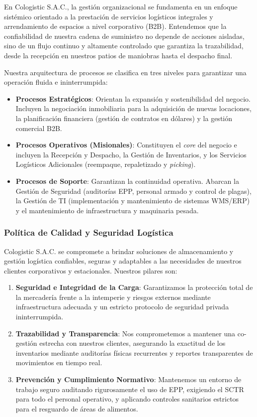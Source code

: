 \documentclass[11pt]{article}
\begin{document}
En Cologistic S.A.C., la gestión organizacional se fundamenta en un
enfoque sistémico orientado a la prestación de servicios logísticos
integrales y arrendamiento de espacios a nivel corporativo (B2B).
Entendemos que la confiabilidad de nuestra cadena de suministro no
depende de acciones aisladas, sino de un flujo continuo y altamente
controlado que garantiza la trazabilidad, desde la recepción en nuestros
patios de maniobras hasta el despacho final.

Nuestra arquitectura de procesos se clasifica en tres niveles para
garantizar una operación fluida e ininterrumpida:

\begin{itemize}
\item
  \textbf{Procesos Estratégicos}: Orientan la expansión y sostenibilidad del
  negocio. Incluyen la negociación inmobiliaria para la adquisición de
  nuevas locaciones, la planificación financiera (gestión de contratos
  en dólares) y la gestión comercial B2B.
\item
  \textbf{Procesos Operativos (Misionales)}: Constituyen el \emph{core} del
  negocio e incluyen la Recepción y Despacho, la Gestión de Inventarios,
  y los Servicios Logísticos Adicionales (reempaque, repaletizado y
  \emph{picking}).
\item
  \textbf{Procesos de Soporte}: Garantizan la continuidad operativa. Abarcan la
  Gestión de Seguridad (auditorías EPP, personal armado y control de
  plagas), la Gestión de TI (implementación y mantenimiento de sistemas
  WMS/ERP) y el mantenimiento de infraestructura y maquinaria pesada.
\end{itemize}

\subsubsection{Política de Calidad y Seguridad Logística}

Cologistic S.A.C. se compromete a brindar soluciones de almacenamiento y gestión logística
confiables, seguras y adaptables a las necesidades de nuestros clientes
corporativos y estacionales. Nuestros pilares son:

\begin{enumerate}
\def\labelenumi{\arabic{enumi}.}
\item
  \textbf{Seguridad e Integridad de la Carga}: Garantizamos la protección total
  de la mercadería frente a la intemperie y riesgos externos mediante
  infraestructura adecuada y un estricto protocolo de seguridad privada
  ininterrumpida.
\item
  \textbf{Trazabilidad y Transparencia}: Nos comprometemos a mantener una
  co-gestión estrecha con nuestros clientes, asegurando la exactitud de
  los inventarios mediante auditorías físicas recurrentes y reportes
  transparentes de movimientos en tiempo real.
\item
  \textbf{Prevención y Cumplimiento Normativo}: Mantenemos un entorno de trabajo
  seguro auditando rigurosamente el uso de EPP, exigiendo el SCTR para
  todo el personal operativo, y aplicando controles sanitarios estrictos
  para el resguardo de áreas de alimentos.
\end{enumerate}
\end{document}
